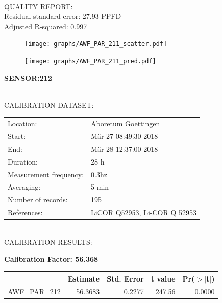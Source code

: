 \documentclass[oneside]{report}
\begin{document}
\hrulefill\\
QUALITY REPORT:\\
Residual standard error: 27.93 PPFD\\
Adjusted R-squared: 0.997



\begin{figure}[H]
  \centering
  \texttt{[image: graphs/AWF\_PAR\_211\_scatter.pdf]}
\end{figure}




\begin{figure}[H]
  \centering
  \texttt{[image: graphs/AWF\_PAR\_211\_pred.pdf]}
\end{figure}

\pagebreak


\begin{center}
\large{\textbf{SENSOR:212}}\\
\end{center}

\hrulefill\\
CALIBRATION DATASET:\\
\begin{table}[h!]
  \centering
  \label{tab:table1}
  \begin{tabular}{ll}
    Location: & Aboretum Goettingen\\ 
    
    
    Start:  & Mär 27 08:49:30 2018 \\
    End:   & Mär 28 12:37:00 2018\\ 
    Duration: & 28 h\\
    Measurement frequency: & 0.3hz\\
    Averaging:  &5 min\\
    Number of records: & 195 \\
    References: & LiCOR Q52953, Li-COR Q 52953 \\
  \end{tabular}
\end{table}

\hrulefill\\
CALIBRATION RESULTS:\\


\begin{center}
\textbf{\large{Calibration Factor: 56.368}}\\
\end{center}
\begin{table}[ht]
\centering
\begin{tabular}{rrrrr}
  \hline
 & Estimate & Std. Error & t value & Pr($>$$|$t$|$) \\ 
  \hline
AWF\_PAR\_212 & 56.3683 & 0.2277 & 247.56 & 0.0000 \\ 
   \hline
\end{tabular}
\end{table}
\end{document}
